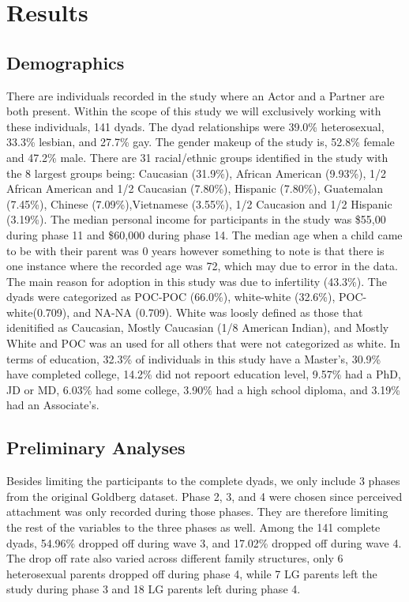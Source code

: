\documentclass[man]{apa6}
\begin{document}
\hypertarget{results}{%
\section{Results}\label{results}}

\hypertarget{demographics}{%
\subsection{Demographics}\label{demographics}}

There are individuals recorded in the study where an Actor and a Partner are both present. Within the scope of this study we will exclusively working with these individuals, 141 dyads.
The dyad relationships were 39.0\% heterosexual, 33.3\% lesbian, and 27.7\% gay.
The gender makeup of the study is, 52.8\% female and 47.2\% male.
There are 31 racial/ethnic groups identified in the study with the 8 largest groups being: Caucasian (31.9\%), African American (9.93\%), 1/2 African American and 1/2 Caucasian (7.80\%), Hispanic (7.80\%), Guatemalan (7.45\%), Chinese (7.09\%),Vietnamese (3.55\%), 1/2 Caucasion and 1/2 Hispanic (3.19\%).
The median personal income for participants in the study was \$55,00 during phase 11 and \$60,000 during phase 14.
The median age when a child came to be with their parent was 0 years however something to note is that there is one instance where the recorded age was 72, which may due to error in the data.
The main reason for adoption in this study was due to infertility (43.3\%).
The dyads were categorized as POC-POC (66.0\%), white-white (32.6\%), POC-white(0.709), and NA-NA (0.709). White was loosly defined as those that idenitified as Caucasian, Mostly Caucasian (1/8 American Indian), and Mostly White and POC was an used for all others that were not categorized as white.
In terms of education, 32.3\% of individuals in this study have a Master's, 30.9\% have completed college, 14.2\% did not repoort education level, 9.57\% had a PhD, JD or MD, 6.03\% had some college, 3.90\% had a high school diploma, and 3.19\% had an Associate's.

\hypertarget{preliminary-analyses}{%
\subsection{Preliminary Analyses}\label{preliminary-analyses}}

Besides limiting the participants to the complete dyads, we only include 3 phases from the original Goldberg dataset. Phase 2, 3, and 4 were chosen since perceived attachment was only recorded during those phases. They are therefore limiting the rest of the variables to the three phases as well. Among the 141 complete dyads, 54.96\% dropped off during wave 3, and 17.02\% dropped off during wave 4. The drop off rate also varied across different family structures, only 6 heterosexual parents dropped off during phase 4, while 7 LG parents left the study during phase 3 and 18 LG parents left during phase 4.
\end{document}
